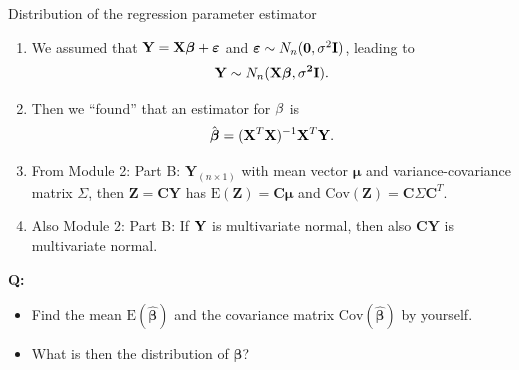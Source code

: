 \documentclass[10pt,ignorenonframetext,]{beamer}
\providecommand{\tightlist}{%
  \setlength{\itemsep}{0pt}\setlength{\parskip}{0pt}}
\begin{document}
\begin{frame}

\begin{block}{Distribution of the regression parameter estimator}

\begin{enumerate}
\def\labelenumi{\arabic{enumi}.}
\tightlist
\item
  We assumed that
  \({\bf Y=X \boldsymbol\beta}+{\boldsymbol \varepsilon}\) and
  \(\boldsymbol\varepsilon\sim N_n({\bf 0},\sigma^2 {\bf I})\), leading
  to \[ {\bf Y} \sim N_{n}(\bf X \boldsymbol \beta,\sigma^2 {\bf I}).\]
\item
  Then we ``found'' that an estimator for \({\bf \beta}\) is
  \[ \hat{\boldsymbol\beta}=({\bf X}^T{\bf X})^{-1} {\bf X}^T {\bf Y}.\]
\item
  From Module 2: Part B: \(\mathbf{Y}_{(n\times 1)}\) with mean vector
  \(\mathbf{\mu}\) and variance-covariance matrix \(\Sigma\), then
  \(\mathbf{Z}=\mathbf{C}\mathbf{Y}\) has
  \(\text{E}(\mathbf{Z})=\mathbf{C}\mathbf{\mu}\) and
  \(\text{Cov}(\mathbf{Z})=  \mathbf{C}\Sigma\mathbf{C}^T\).
\item
  Also Module 2: Part B: If \({\bf Y}\) is multivariate normal, then
  also \(\mathbf{C}\mathbf{Y}\) is multivariate normal.
\end{enumerate}

\textbf{Q:}

\begin{itemize}
\tightlist
\item
  Find the mean \(\text{E}(\hat{\boldsymbol\beta})\) and the covariance
  matrix \(\text{Cov}(\hat{\boldsymbol\beta})\) by yourself.
\item
  What is then the distribution of \(\hat{\boldsymbol\beta}\)?
\end{itemize}

\end{block}

\end{frame}
\end{document}
